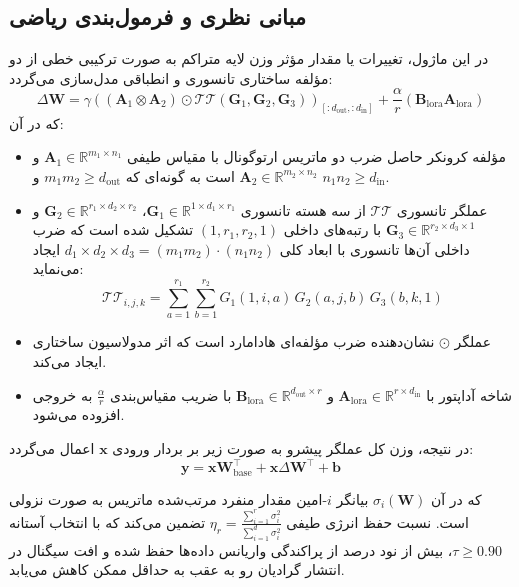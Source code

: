 \subsection{مبانی نظری و فرمول‌بندی ریاضی}
در این ماژول، تغییرات یا مقدار مؤثر وزن لایه متراکم به صورت ترکیبی خطی از دو مؤلفه ساختاری تانسوری و انطباقی مدل‌سازی می‌گردد:
\begin{equation}
\Delta \mathbf{W} = \gamma \left( (\mathbf{A}_1 \otimes \mathbf{A}_2) \odot \mathcal{TT}(\mathbf{G}_1, \mathbf{G}_2, \mathbf{G}_3) \right)_{[:d_{\text{out}}, :d_{\text{in}}]} + \frac{\alpha}{r} (\mathbf{B}_{\text{lora}} \mathbf{A}_{\text{lora}})
\end{equation}
که در آن:
\begin{itemize}
    \item مؤلفه کرونکر حاصل ضرب دو ماتریس ارتوگونال با مقیاس طیفی $\mathbf{A}_1 \in \mathbb{R}^{m_1 \times n_1}$ و $\mathbf{A}_2 \in \mathbb{R}^{m_2 \times n_2}$ است به گونه‌ای که $m_1 m_2 \ge d_{\text{out}}$ و $n_1 n_2 \ge d_{\text{in}}$.
    \item عملگر تانسوری $\mathcal{TT}$ از سه هسته تانسوری $\mathbf{G}_1 \in \mathbb{R}^{1 \times d_1 \times r_1}$، $\mathbf{G}_2 \in \mathbb{R}^{r_1 \times d_2 \times r_2}$ و $\mathbf{G}_3 \in \mathbb{R}^{r_2 \times d_3 \times 1}$ با رتبه‌های داخلی $(1, r_1, r_2, 1)$ تشکیل شده است که ضرب داخلی آن‌ها تانسوری با ابعاد کلی $d_1 \times d_2 \times d_3 = (m_1 m_2) \cdot (n_1 n_2)$ ایجاد می‌نماید:
    \begin{equation}
    \mathcal{TT}_{i, j, k} = \sum_{a=1}^{r_1} \sum_{b=1}^{r_2} G_{1}(1, i, a) \, G_{2}(a, j, b) \, G_{3}(b, k, 1)
    \end{equation}
    \item عملگر $\odot$ نشان‌دهنده ضرب مؤلفه‌ای هادامارد است که اثر مدولاسیون ساختاری ایجاد می‌کند.
    \item شاخه آداپتور با $\mathbf{A}_{\text{lora}} \in \mathbb{R}^{r \times d_{\text{in}}}$ و $\mathbf{B}_{\text{lora}} \in \mathbb{R}^{d_{\text{out}} \times r}$ با ضریب مقیاس‌بندی $\frac{\alpha}{r}$ به خروجی افزوده می‌شود.
\end{itemize}

در نتیجه، وزن کل عملگر پیشرو به صورت زیر بر بردار ورودی $\mathbf{x}$ اعمال می‌گردد:
\begin{equation}
\mathbf{y} = \mathbf{x} \mathbf{W}_{\text{base}}^\top + \mathbf{x} \Delta \mathbf{W}^\top + \mathbf{b}
\end{equation}

که در آن $\sigma_i(\mathbf{W})$ بیانگر $i$-امین مقدار منفرد مرتب‌شده ماتریس به صورت نزولی است. نسبت حفظ انرژی طیفی $\eta_r = \frac{\sum_{i=1}^r \sigma_i^2}{\sum_{i=1}^{d} \sigma_i^2}$ تضمین می‌کند که با انتخاب آستانه $\tau \ge 0.90$، بیش از نود درصد از پراکندگی واریانس داده‌ها حفظ شده و افت سیگنال در انتشار گرادیان رو به عقب به حداقل ممکن کاهش می‌یابد.

